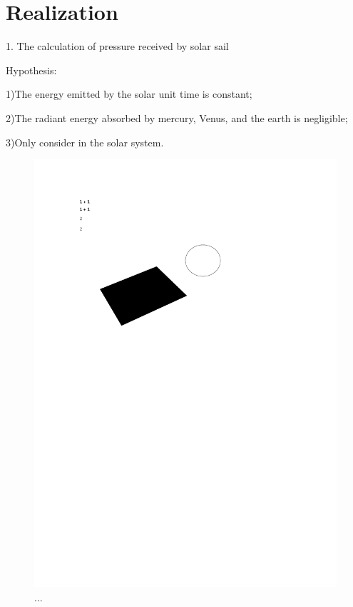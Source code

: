 \documentclass[../Paper.tex]{subfiles}
\begin{document}
\section{Realization}

1. The calculation of pressure received by solar sail  

Hypothesis:

1)The energy emitted by the solar unit time is constant; 

2)The radiant energy absorbed by mercury, Venus, and the earth is negligible; 

3)Only consider in the solar system. 






\begin{figure}[H]
\centering
\includegraphics[width=12cm]{../Figures/1.pdf}
\caption{...}
\label{fig1}
\end{figure}
\end{document}
